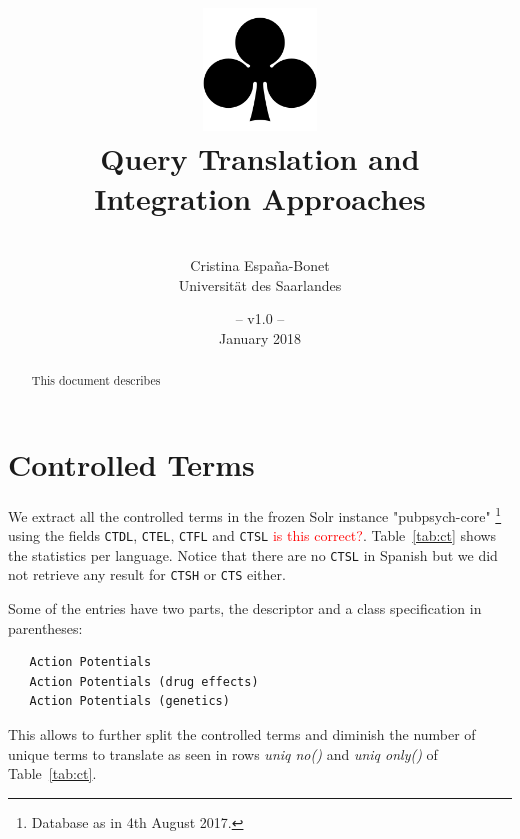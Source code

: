 \documentclass[a4paper,11pt]{article}
\title{
\includegraphics[width=3cm]{./img/200px-SuitClubs.png} \\
\Huge Query Translation and \\ Integration Approaches \\ 
}
\author{\vspace*{1cm}\\ \LARGE Cristina Espa\~na-Bonet \medskip \\ \Large Universit\"at des Saarlandes}
\date{\vspace*{2cm} -- v1.0 --\\January 2018}
\newcommand{\red}[1]{\textcolor{red}{#1}}
\begin{document}
\clearpage\maketitle
\thispagestyle{empty}

\vspace*{5cm}
\begin{abstract}
This document describes 
\end{abstract}

\newpage
\tableofcontents
\clearpage



\section{Controlled Terms}
\label{s:ct}

We extract all the controlled terms in the frozen Solr instance "pubpsych-core"%
\footnote{Database as in 4th August 2017.}  using the fields {\tt CTDL}, {\tt CTEL}, {\tt CTFL} and {\tt CTSL} \red{is this correct?}. Table~\ref{tab:ct} shows the statistics per language. Notice that there are no {\tt CTSL} in Spanish but we did not retrieve any result for {\tt CTSH} or {\tt CTS} either.

Some of the entries have two parts, the descriptor and a class specification in parentheses:
{\small 
\begin{verbatim}
   Action Potentials
   Action Potentials (drug effects)
   Action Potentials (genetics)
\end{verbatim}
}

This allows to further split the controlled terms and diminish the number of unique terms to translate as seen in rows \emph{uniq no()} and \emph{uniq only()} of Table~\ref{tab:ct}.
\end{document}
